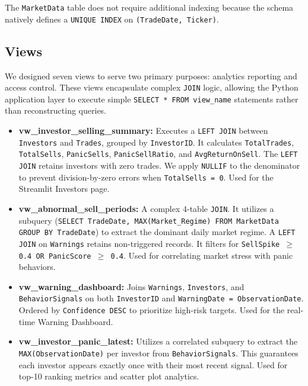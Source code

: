 The \texttt{MarketData} table does not require additional indexing because the schema natively defines a \texttt{UNIQUE INDEX} on \texttt{(TradeDate, Ticker)}.

\subsection{Views}
We designed seven views to serve two primary purposes: analytics reporting and access control. These views encapsulate complex \texttt{JOIN} logic, allowing the Python application layer to execute simple \texttt{SELECT * FROM view\_name} statements rather than reconstructing queries.

\begin{itemize}
    \item \textbf{vw\_investor\_selling\_summary:} Executes a \texttt{LEFT JOIN} between \texttt{Investors} and \texttt{Trades}, grouped by \texttt{InvestorID}. It calculates \texttt{TotalTrades}, \texttt{TotalSells}, \texttt{PanicSells}, \texttt{PanicSellRatio}, and \texttt{AvgReturnOnSell}. The \texttt{LEFT JOIN} retains investors with zero trades. We apply \texttt{NULLIF} to the denominator to prevent division-by-zero errors when \texttt{TotalSells = 0}. Used for the Streamlit Investors page.
    
    \item \textbf{vw\_abnormal\_sell\_periods:} A complex 4-table \texttt{JOIN}. It utilizes a subquery (\texttt{SELECT TradeDate, MAX(Market\_Regime) FROM MarketData GROUP BY TradeDate}) to extract the dominant daily market regime. A \texttt{LEFT JOIN} on \texttt{Warnings} retains non-triggered records. It filters for \texttt{SellSpike $\ge$ 0.4 OR PanicScore $\ge$ 0.4}. Used for correlating market stress with panic behaviors.
    
    \item \textbf{vw\_warning\_dashboard:} Joins \texttt{Warnings}, \texttt{Investors}, and \texttt{BehaviorSignals} on both \texttt{InvestorID} and \texttt{WarningDate = ObservationDate}. Ordered by \texttt{Confidence DESC} to prioritize high-risk targets. Used for the real-time Warning Dashboard.
    
    \item \textbf{vw\_investor\_panic\_latest:} Utilizes a correlated subquery to extract the \texttt{MAX(ObservationDate)} per investor from \texttt{BehaviorSignals}. This guarantees each investor appears exactly once with their most recent signal. Used for top-10 ranking metrics and scatter plot analytics.
    

\end{itemize}
